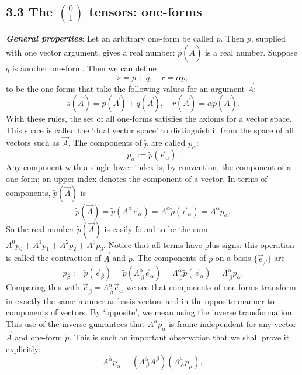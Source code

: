 \documentclass[12pt]{book}
\begin{document}
    \subsection{3.3 The \(\binom{0}{1}\) tensors: one-forms}

    \textit{\textbf{General properties}}: Let an arbitrary one-form be called \(\tilde{p}\). Then \(\tilde{p}\), supplied with one vector argument, gives a real number: \(\tilde{p}(\vec{A})\) is a real number. Suppose \(\tilde{q}\) is another one-form. Then we can define
    \[
    \tilde{s} = \tilde{p} + \tilde{q}, \quad \tilde{r} = \alpha \tilde{p},
    \]
    to be the one-forms that take the following values for an argument \(\vec{A}\):
    \[
    \tilde{s}(\vec{A}) = \tilde{p}(\vec{A}) + \tilde{q}(\vec{A}), \quad \tilde{r}(\vec{A}) = \alpha \tilde{p}(\vec{A}).
    \]
    With these rules, the set of all one-forms satisfies the axioms for a vector space. This space is called the ‘dual vector space’ to distinguish it from the space of all vectors such as \(\vec{A}\).
    The components of \(\tilde{p}\) are called \(p_\alpha\):
    \[
    p_\alpha := \tilde{p}(\vec{e}_\alpha). \tag{3.7}
    \]
    Any component with a single lower index is, by convention, the component of a one-form; an upper index denotes the component of a vector. In terms of components, \(\tilde{p}(\vec{A})\) is
    \[
    \tilde{p}(\vec{A}) = \tilde{p}(A^\alpha \vec{e}_\alpha)
    = A^\alpha \tilde{p}(\vec{e}_\alpha)= A^\alpha p_\alpha. \tag{3.8}
    \]
    So the real number \(\tilde{p}(\vec{A})\) is easily found to be the sum \(A^0p_0 + A^1p_1 + A^2p_2 + A^3p_3\). Notice that all terms have plus signs: this operation is called the contraction of \(\vec{A}\) and \(\tilde{p}\). The components of \(\tilde{p}\) on a basis \(\{\vec{e}_{\bar{\beta}}\}\) are
    \[
    p_{\bar{\beta}} := \tilde{p}(\vec{e}_{\bar{\beta}}) = \tilde{p}(\Lambda^\alpha_{\ \bar{\beta}} \vec{e}_\alpha)
    = \Lambda^\alpha_{\ \bar{\beta}} \tilde{p}(\vec{e}_\alpha) = \Lambda^\alpha_{\ \bar{\beta}} p_\alpha. \tag{3.9}
    \]
    Comparing this with  \(\vec{e}_{\bar{\beta}} = \Lambda^\alpha_{\ \bar{\beta}} \vec{e}_\alpha\) we see that components of one-forms transform in exactly the same manner as basis vectors and in the opposite manner to components of vectors. By ‘opposite’, we mean using the inverse transformation. This use of the inverse guarantees that \(A^\alpha p_\alpha\) is frame-independent for any vector \(\vec{A}\) and one-form \(\tilde{p}\). This is such an important observation that we shall prove it explicitly:    \[
    A^{\bar{\alpha}} p_{\bar{\alpha}} = (\Lambda^{\bar{\alpha}}_{\ \beta} A^\beta)(\Lambda^\mu_{\ \bar{\alpha}} p_\mu), \tag{3.10a}
    \]
\end{document}
